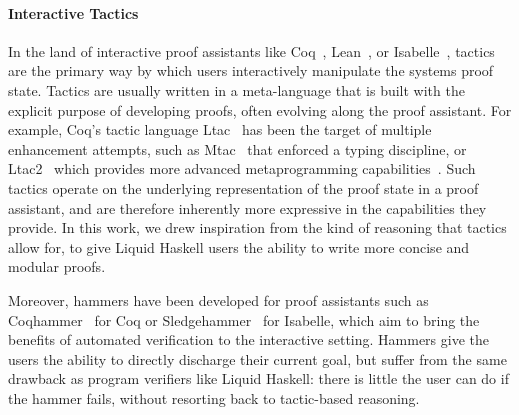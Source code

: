 \paragraph{Interactive Tactics}
In the land of interactive proof assistants like
Coq~\cite{the_coq_development_team_2020_3744225}, Lean~\cite{Lean4},
or Isabelle~\cite{Isabelle}, tactics are the primary way by which
users interactively manipulate the systems proof state. Tactics are
usually written in a meta-language that is built with the explicit
purpose of developing proofs, often evolving along the proof
assistant. For example, Coq's tactic language Ltac~\cite{Ltac} has
been the target of multiple enhancement attempts, such as
Mtac~\cite{Mtac} that enforced a typing discipline, or
Ltac2~\cite{ltac2} which provides more advanced metaprogramming
capabilities~\cite{ComputingCorrectly}. Such tactics operate on the
underlying representation of the proof state in a proof assistant, and
are therefore inherently more expressive in the capabilities they
provide. In this work, we drew inspiration from the kind of reasoning
that tactics allow for, to give Liquid Haskell users the ability to
write more concise and modular proofs.

Moreover, hammers have been developed for proof assistants
such as Coqhammer~\cite{CoqHammer, Coqhammer-sauto} for Coq or
Sledgehammer~\cite{Sledgehammer, SledgehammerSMT} for Isabelle, which
aim to bring the benefits of automated verification to the interactive
setting. Hammers give the users the ability to directly discharge
their current goal, but suffer from the same drawback as program
verifiers like Liquid Haskell: there is little the user can do if the
hammer fails, without resorting back to tactic-based reasoning.  
%  

